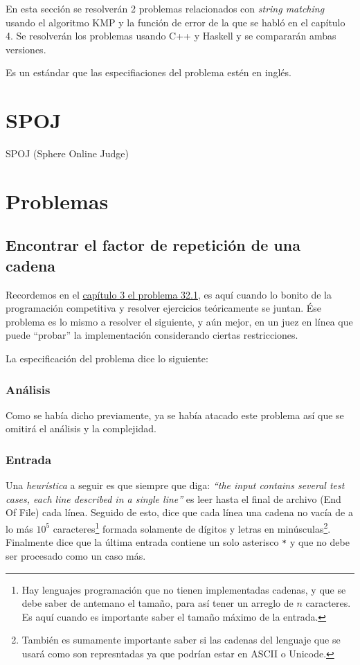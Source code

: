\label{chap:jueces}

En esta sección se resolverán 2 problemas relacionados con \textit{string matching} usando el
algoritmo KMP y la función de error de la que se habló en el capítulo 4. Se resolverán los
problemas usando C++ y Haskell y se compararán ambas versiones.

Es un estándar que las especifiaciones del problema estén en inglés.


\section{SPOJ}
SPOJ (Sphere Online Judge)

\section{Problemas}


\subsection{Encontrar el factor de repetición de una cadena}
Recordemos en el \hyperlink{repetition_factor}{capítulo 3 el problema 32.1}, es aquí cuando lo
bonito de la programación competitiva y resolver ejercicios teóricamente se juntan. Ése problema
es lo mismo a resolver el siguiente, y aún mejor, en un juez en línea que puede ``probar'' la
implementación considerando ciertas restricciones.

La especificación del problema dice lo siguiente: 



\subsubsection{Análisis}
Como se había dicho previamente, ya se había atacado este problema así que se omitirá el análisis
y la complejidad.

\subsubsection{Entrada}
Una \textit{heurística} a seguir es que siempre que diga: \textit{``the input contains several test
cases, each line described in a single line''} es leer hasta el final de archivo (End Of File) cada
línea. Seguido de esto, dice que cada línea una cadena no vacía de a lo más $10^5$
caracteres\footnote{Hay lenguajes programación que no tienen implementadas cadenas, y que se debe
saber de antemano el tamaño, para así tener un arreglo de $n$ caracteres. Es aquí cuando es
importante saber el tamaño máximo de la entrada.} formada solamente de dígitos y letras en
minúsculas\footnote{También es sumamente importante saber si las cadenas del lenguaje que se usará
como son represntadas ya que podrían estar en ASCII o Unicode.}.
Finalmente dice que la última entrada contiene un solo asterisco \texttt{*} y que no debe ser
procesado como un caso más.

